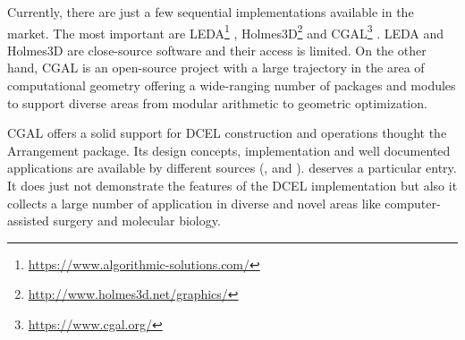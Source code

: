 Currently, there are just a few sequential implementations available in the market.  The most important are LEDA\footnote{\url{https://www.algorithmic-solutions.com/}} \cite{mehlhorn_leda_1995}, Holmes3D\footnote{\url{http://www.holmes3d.net/graphics/}} \cite{holmes_dcel_2021} and CGAL\footnote{\url{https://www.cgal.org/}} \cite{fogel_cgal_2012}.  LEDA and Holmes3D are close-source software and their access is limited.  On the other hand, CGAL is an open-source project with a large trajectory in the area of computational geometry offering a wide-ranging number of packages and modules to support diverse areas from modular arithmetic to geometric optimization.

CGAL offers a solid support for DCEL construction and operations thought the Arrangement package.  Its design concepts, implementation and well documented applications are available by different sources (\cite{flato_design_2001}, \cite{haran_experimental_2009} and \cite{wein_advanced_2007}).  \cite{fogel_cgal_2012} deserves a particular entry.  It does just not demonstrate the features of the DCEL implementation but also it collects a large number of application in diverse and novel areas like computer-assisted surgery and molecular biology.

